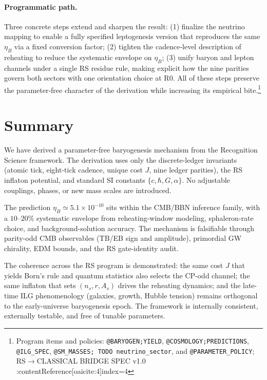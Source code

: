 \documentclass[11pt]{article}
\begin{document}
\paragraph{Programmatic path.}
Three concrete steps extend and sharpen the result: (1) finalize the neutrino mapping to enable a fully specified leptogenesis version that reproduces the same \(\eta_B\) via a fixed conversion factor; (2) tighten the cadence‑level description of reheating to reduce the systematic envelope on \(\eta_B\); (3) unify baryon and lepton channels under a single RS residue rule, making explicit how the nine parities govern both sectors with one orientation choice at R0. All of these steps preserve the parameter‑free character of the derivation while increasing its empirical bite.\footnote{Program items and policies: \texttt{@BARYOGEN;YIELD}, \texttt{@COSMOLOGY;PREDICTIONS}, \texttt{@ILG\_SPEC}, \texttt{@SM\_MASSES; TODO neutrino\_sector}, and \texttt{@PARAMETER\_POLICY}; RS\(\to\)CLASSICAL BRIDGE SPEC v1.0 :contentReference[oaicite:4]{index=4}}

\section{Summary}

We have derived a parameter-free baryogenesis mechanism from the Recognition Science framework. The derivation uses only the discrete-ledger invariants (atomic tick, eight-tick cadence, unique cost $J$, nine ledger parities), the RS inflaton potential, and standard SI constants $\{c,\hbar,G,\alpha\}$. No adjustable couplings, phases, or new mass scales are introduced.

The prediction $\eta_B\simeq 5.1\times 10^{-10}$ sits within the CMB/BBN inference family, with a $10$--$20\%$ systematic envelope from reheating-window modeling, sphaleron-rate choice, and background-solution accuracy. The mechanism is falsifiable through parity-odd CMB observables (TB/EB sign and amplitude), primordial GW chirality, EDM bounds, and the RS gate-identity audit.

The coherence across the RS program is demonstrated: the same cost $J$ that yields Born's rule and quantum statistics also selects the CP-odd channel; the same inflaton that sets $(n_s, r, A_s)$ drives the reheating dynamics; and the late-time ILG phenomenology (galaxies, growth, Hubble tension) remains orthogonal to the early-universe baryogenesis epoch. The framework is internally consistent, externally testable, and free of tunable parameters.
\end{document}
